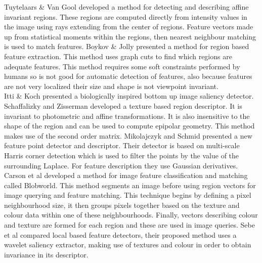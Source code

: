 Tuytelaars \& Van Gool \cite{Tuytelaars00Wide} developed a method for detecting and describing affine invariant regions. These regions are computed directly from intensity values in the image using rays extending from the center of regions. Feature vectors made up from statistical moments within the regions, then nearest neighbour matching is used to match features. Boykov \& Jolly \cite{Boykov01Interactive} presented a method for region based feature extraction. This method uses graph cuts to find which regions are adequate features. This method requires some soft constraints performed by humans so is not good for automatic detection of features, also because features are not very localized their size and shape is not viewpoint invariant.\\


Itti \& Koch \cite{Itti01Computational} presented a biologically inspired bottom up image saliency detector. Schaffalizky and Zisserman \cite{Schaffalitzky01Viewpoint} developed a texture based region descriptor. It is invariant to photometric and affine transformations. It is also insensitive to the shape of the region and can be used to compute epipolar geometry. This method makes use of the second order matrix. Mikolajczyk and Schmid \cite{Mikolajczyk01Indexing} presented a new feature point detector and descriptor. Their detector is based on multi-scale Harris corner detection which is used to filter the points by the value of the surrounding Laplace. For feature description they use Gaussian derivatives. \\


Carson et al \cite{Carson02Blobworld} developed a method for image feature classification and matching called Blobworld. This method segments an image before using region vectors for image querying and feature matching. This technique begins by defining a pixel neighbourhood size, it then groups pixels together based on the texture and colour data within one of these neighbourhoods. Finally, vectors describing colour and texture are formed for each region and these are used in image queries. Sebe et al \cite{Sebe03Evaluation} compared local based feature detectors, their proposed method uses a wavelet saliency extractor, making use of textures and colour in order to obtain invariance in its descriptor. \\



